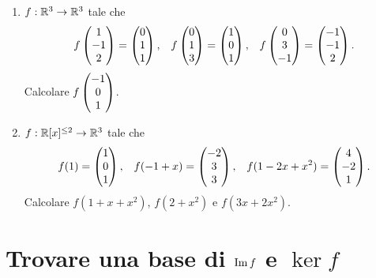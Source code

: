 \begin{exercise}
\begin{enumerate}[(1)]
        \item $f : \mathbb{R}^3 \to \mathbb{R}^3$ tale che \begin{align*}
            f\begin{pmatrix} 1\\-1\\2 \end{pmatrix} = \begin{pmatrix} 0\\1\\1 \end{pmatrix}, &&f\begin{pmatrix} 0\\1\\3 \end{pmatrix} = \begin{pmatrix} 1\\0\\1 \end{pmatrix}, &&f\begin{pmatrix} 0\\3\\-1 \end{pmatrix} = \begin{pmatrix} -1\\-1\\2 \end{pmatrix}.
        \end{align*}
        Calcolare $f\begin{pmatrix} -1\\0\\1 \end{pmatrix}$.
        \item $f : \mathbb{R}[x]^{\leq 2} \to \mathbb{R}^3$ tale che \begin{align*}
            f(1) = \begin{pmatrix} 1\\0\\1 \end{pmatrix}, &&f(-1+x) = \begin{pmatrix} -2\\3\\3 \end{pmatrix}, &&f(1-2x+x^2) = \begin{pmatrix} 4\\-2\\1 \end{pmatrix}.
        \end{align*}
        Calcolare $f(1+x+x^2)$, $f(2+x^2)$ e $f(3x+2x^2)$.
    \end{enumerate}
\end{exercise}

\section{Trovare una base di $\operatorname{Im}f$ e $\ker f$}

